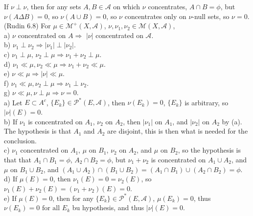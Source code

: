 \documentclass[12pt]{article}
\newcommand{\partset}[1]{ \mathcal{P}^{*}(#1) }
\newcommand{\fall}[0] { \textrm{ for all } }
\newcommand{\A}[0] { \mathcal{A} }
\newcommand{\M}[0] { \mathcal{M} }
\newcommand{\rimply}[0] { \Rightarrow }
\begin{document}
\noindent
If $\nu \perp \nu$, then for any sets $A,B \in \A$ on which $\nu$ concentrates, $A \cap B = \phi$, but $\nu(A \Delta B) = 0$, so $\nu(A \cup B) = 0$, so $\nu$ concentrates only on $\nu$-null sets, so $\nu=0$. \\


(Rudin 6.8) For $\mu \in \M^+(X, \A)$, $\nu,\nu_1,\nu_2 \in \M(X, \A)$, \\

\noindent
a) $\nu$ concentrated on $A \rimply$ $|\nu|$ concentrated on $\A$. \\
b) $\nu_1 \perp \nu_2 \rimply |\nu_1| \perp |\nu_2|$. \\
c) $\nu_1 \perp \mu$, $\nu_2 \perp \mu \rimply \nu_1 + \nu_2 \perp \mu$. \\
d) $\nu_1 \ll \mu, \nu_2 \ll \mu \rimply \nu_1 + \nu_2 \ll \mu$. \\
e) $\nu \ll \mu \rimply |\nu| \ll \mu$. \\
f) $\nu_1 \ll \mu, \nu_2 \perp \mu \rimply \nu_1 \perp \nu_2$. \\
g) $\nu \ll \mu, \nu \perp \mu \rimply \nu = 0$. \\

\noindent
a) Let $E \subset A^c$, $\{ E_k \} \in \partset{E, \A}$, then $\nu(E_k) = 0$, $\{E_k\}$ is arbitrary, so $|\nu|(E) = 0$. \\

\noindent
b) If $\nu_1$ is concentrated on $A_1$, $\nu_2$ on $A_2$, then $|\nu_1|$ on $A_1$, and $|\nu_2|$ on $A_2$ by (a). The hypothesis is that $A_1$ and $A_2$ are disjoint, this is then what is needed for the conclusion. \\

\noindent
c) $\nu_1$ concentrated on $A_1$, $\mu$ on $B_1$, $\nu_2$ on $A_2$, and $\mu$ on $B_2$, so the hypothesis is that that $A_1 \cap B_1 = \phi$, $A_2 \cap B_2 = \phi$, but $\nu_1 + \nu_2$ is concentrated on $A_1 \cup A_2$, and $\mu$  on $B_1 \cup B_2$, and $(A_1 \cup A_2) \cap (B_1 \cup B_2) = (A_1 \cap B_1) \cup (A_2 \cap B_2) = \phi$. \\

\noindent
d) If $\mu(E) = 0$, then $\nu_1(E) = 0 = \nu_2(E)$, so $\nu_1(E) + \nu_2(E) = (\nu_1 + \nu_2)(E) = 0$.\\

\noindent
e) If $\mu(E) = 0$, then for any $\{ E_k \} \in \partset{E, \A}$, $\mu(E_k) = 0$, thus $\nu(E_k) = 0 \fall E_k$ bu hypothesis, and thus $|\nu|(E) = 0$.   \\
\end{document}
